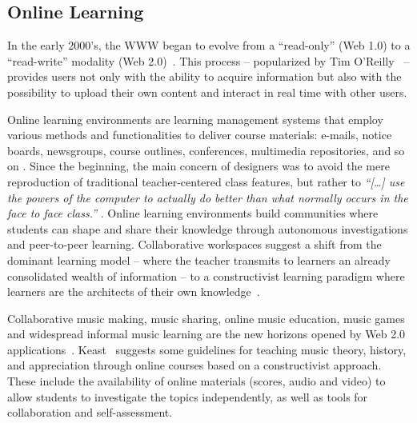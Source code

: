 \documentclass[journal]{IEEEtran}
\begin{document}
\subsection{Online Learning}
\label{subsec:OL}
In the early 2000's, the WWW began to evolve from a ``read-only'' (Web 1.0) to a ``read-write'' modality (Web 2.0)~\cite{salavuo2008social}. This process -- popularized by Tim O'Reilly~\cite{oreilly} -- provides users not only with the ability to acquire information but also with the possibility to upload their own content and interact in real time with other users.  

Online learning environments are learning management systems that employ various methods and functionalities to deliver course materials: e-mails, notice boards, newsgroups, course outlines, conferences, multimedia repositories, and so on \cite{britain2004framework}.
Since the beginning, the main concern of designers was to avoid the mere reproduction of traditional teacher-centered class features, but rather to \textit{``[\ldots] use the powers of the computer to actually do better than what normally occurs in the face to face class.''} \cite[p. 1]{turoff1995}. Online learning environments build communities where students can shape and share their knowledge through autonomous investigations and peer-to-peer learning.  
Collaborative workspaces suggest a shift from the dominant learning model -- where the teacher transmits to learners an already consolidated wealth of information -- to a constructivist learning paradigm where learners are the architects of their own knowledge~\cite{jonassen1995constructivism}. 

Collaborative music making, music sharing, online music education, music games and widespread informal music learning are the new horizons opened by Web 2.0 applications~\cite{ruismaki2009new}. Keast~\cite{keast2009constructivist} suggests some guidelines for teaching music theory, history, and appreciation through online courses based on a constructivist approach. These include the availability of online materials (scores, audio and video) to allow students to investigate the topics independently, as well as tools for collaboration and self-assessment.  
\end{document}
